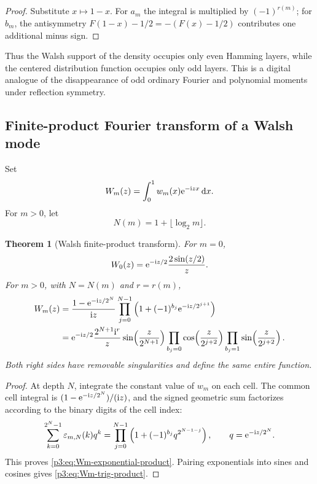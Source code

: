 \documentclass[11pt]{article}
\newtheorem{theorem}{Theorem}[section]
\theoremstyle{definition}
\theoremstyle{remark}
\newcommand{\dd}{\,\mathrm d}
\begin{document}
\begin{proof}
Substitute $x\mapsto1-x$.  For $a_m$ the integral is multiplied by
$(-1)^{r(m)}$; for $b_m$, the antisymmetry
$F(1-x)-1/2=-(F(x)-1/2)$ contributes one additional minus sign.
\end{proof}

Thus the Walsh support of the density occupies only even Hamming layers, while
the centered distribution function occupies only odd layers.  This is a
digital analogue of the disappearance of odd ordinary Fourier and polynomial
moments under reflection symmetry.

\subsection{Finite-product Fourier transform of a Walsh mode}

Set
\begin{equation}\label{p3:eq:Wm-def}
 W_m(z)=\int_0^1w_m(x)\e^{-\ii zx}\dd x.
\end{equation}
For $m>0$, let
\begin{equation}\label{p3:eq:Nm-def}
 N(m)=1+\lfloor\log_2m\rfloor.
\end{equation}

\begin{theorem}[Walsh finite-product transform]
\label{p3:thm:Walsh-product-transform}
For $m=0$,
\begin{equation}\label{p3:eq:W0}
 W_0(z)=\mathrm e^{-\mathrm i z/2}\frac{2\sin(z/2)}{z}.
\end{equation}
For $m>0$, with $N=N(m)$ and $r=r(m)$,
\begin{align}
 W_m(z)
 &=\frac{1-\mathrm e^{-\mathrm i z/2^N}}{\mathrm i z}
   \prod_{j=0}^{N-1}
   \left(1+(-1)^{b_j}\mathrm e^{-\mathrm i z/2^{j+1}}\right)
 \label{p3:eq:Wm-exponential-product}\\
 &=\mathrm e^{-\mathrm i z/2}\frac{2^{N+1}\mathrm i^r}{z}
   \sin\!\left(\frac{z}{2^{N+1}}\right)
   \prod_{b_j=0}\cos\!\left(\frac{z}{2^{j+2}}\right)
   \prod_{b_j=1}\sin\!\left(\frac{z}{2^{j+2}}\right).
 \label{p3:eq:Wm-trig-product}
\end{align}
Both right sides have removable singularities and define the same entire
function.
\end{theorem}

\begin{proof}
At depth $N$, integrate the constant value of $w_m$ on each cell.  The common
cell integral is $(1-\mathrm e^{-\mathrm i z/2^N})/(\mathrm i z)$, and the signed geometric sum
factorizes according to the binary digits of the cell index:
\[
 \sum_{k=0}^{2^N-1}\varepsilon_{m,N}(k)q^k
 =\prod_{j=0}^{N-1}\left(1+(-1)^{b_j}q^{2^{N-1-j}}\right),
 \qquad q=\mathrm e^{-\mathrm i z/2^N}.
\]
This proves \eqref{p3:eq:Wm-exponential-product}.  Pairing exponentials into sines
and cosines gives \eqref{p3:eq:Wm-trig-product}.
\end{proof}
\end{document}

